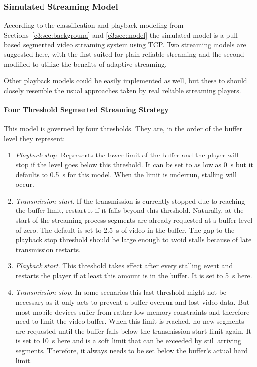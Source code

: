 \subsubsection{Simulated Streaming Model}

According to the classification and playback modeling from Sections~\ref{c3:sec:background} and \ref{c3:sec:model} the simulated model is a pull-based segmented video streaming system using \gls{TCP}. Two streaming models are suggested here, with the first suited for plain reliable streaming and the second modified to utilize the benefits of adaptive streaming.

Other playback models could be easily implemented as well, but these to should closely resemble the usual approaches taken by real reliable streaming players.


\paragraph{Four Threshold Segmented Streaming Strategy}

This model is governed by four thresholds. They are, in the order of the buffer level they represent:

\begin{enumerate}
	\item \textit{Playback stop}. Represents the lower limit of the buffer and the player will stop if the level goes below this threshold. It can be set to as low as \SI{0}{\second} but it defaults to \SI{0.5}{\second} for this model. When the limit is underrun, stalling will occur.

	\item \textit{Transmission start}. If the transmission is currently stopped due to reaching the buffer limit, restart it if it falls beyond this threshold. Naturally, at the start of the streaming process segments are already requested at a buffer level of zero. The default is set to \SI{2.5}{\second} of video in the buffer. The gap to the playback stop threshold should be large enough to avoid stalls because of late transmission restarts.

	\item \textit{Playback start}. This threshold takes effect after every stalling event and restarts the player if at least this amount is in the buffer. It is set to \SI{5}{\second} here.

	\item \textit{Transmission stop}. In some scenarios this last threshold might not be necessary as it only acts to prevent a buffer overrun and lost video data. But most mobile devices suffer from rather low memory constraints and therefore need to limit the video buffer. When this limit is reached, no new segments are requested until the buffer falls below the transmission start limit again. It is set to \SI{10}{\second} here and is a soft limit that can be exceeded by still arriving segments. Therefore, it always needs to be set below the buffer's actual hard limit.
\end{enumerate}


